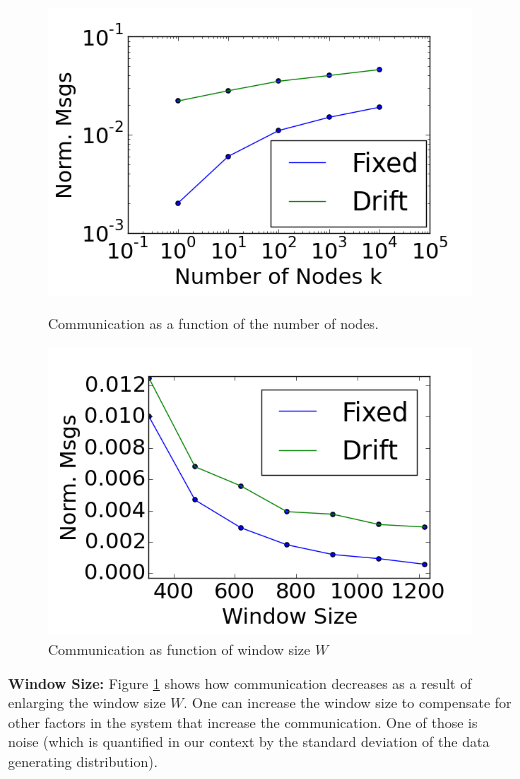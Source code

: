 \begin{figure}[!htb]
  \includegraphics[width=\linewidth]{CommunicationOfFixedVsDrift/Nodes.png}
  \caption{Communication as a function of the number of nodes.}\label{Nodes}
\endminipage\hfill
{}
  \includegraphics[width=\linewidth]{CommunicationOfFixedVsDrift/WindowSize.png}
  \caption{Communication as function of window size $W$}\label{WindowSize}
\endminipage
\end{figure}

\noindent\textbf{Window Size:}
Figure \ref{WindowSize} shows how communication decreases as a result
of enlarging the window size $W$.  One can increase the window size to compensate for other factors in the system that increase the communication. One of those is
noise (which is quantified in our context by the standard deviation of the
data generating distribution).

